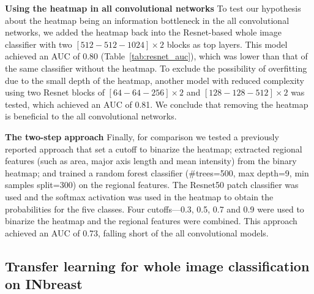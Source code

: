 \documentclass[12pt,letterpaper]{article}
\begin{document}
\textbf{Using the heatmap in all convolutional networks}
\label{heatmap_auc}
To test our hypothesis about the heatmap being an information bottleneck in the all convolutional networks, we added the heatmap back into the Resnet-based whole image classifier with two $[512-512-1024] \times 2$ blocks as top layers. This model achieved an AUC of 0.80 (Table~\ref{tab:resnet_auc}), which was lower than that of the same classifier without the heatmap. To exclude the possibility of overfitting due to the small depth of the heatmap, another model with reduced complexity using two Resnet blocks of $[64-64-256] \times 2$ and $[128-128-512] \times 2$ was tested, which achieved an AUC of 0.81. We conclude that removing the heatmap is beneficial to the all convolutional networks.

\textbf{The two-step approach}
\label{two_step_auc}
Finally, for comparison we tested a previously reported approach \cite{shen_breast_2017,wang_deep_2016} that set a cutoff to binarize the heatmap; extracted regional features (such as area, major axis length and mean intensity) from the binary heatmap; and trained a random forest classifier (\#trees=500, max depth=9, min samples split=300) on the regional features. The Resnet50 patch classifier was used and the softmax activation was used in the heatmap to obtain the probabilities for the five classes. Four cutoffs---0.3, 0.5, 0.7 and 0.9 were used to binarize the heatmap and the regional features were combined. This approach achieved an AUC of 0.73, falling short of the all convolutional models.

\subsection{Transfer learning for whole image classification on INbreast}
\label{inbreast}
\end{document}
